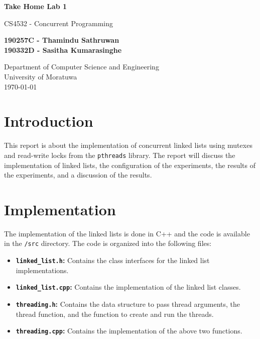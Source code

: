 \documentclass[a4paper,12pt]{article}
\begin{document}
\begin{titlepage}
    \begin{center}
        \vspace*{1cm}

        \LARGE
        \textbf{Take Home Lab 1}

        \vspace{0.5cm}

        \large
        CS4532 - Concurrent Programming

        \vspace{1.5cm}

        \textbf{190257C - Thamindu Sathruwan\\190332D - Sasitha Kumarasinghe}

        \vfill

        \normalsize
        Department of Computer Science and Engineering\\
        University of Moratuwa\\
        \today

    \end{center}
\end{titlepage}

\tableofcontents
\newpage

\section{Introduction}

This report is about the implementation of concurrent linked lists using mutexes and read-write locks from the \lstinline|pthreads| library. The report will discuss the implementation of linked lists, the configuration of the experiments, the results of the experiments, and a discussion of the results.

\section{Implementation}

The implementation of the linked lists is done in C++ and the code is available in the \lstinline|/src| directory. The code is organized into the following files:

\begin{itemize}
    \itemsep 0em
    \item \textbf{\lstinline|linked_list.h|:} Contains the class interfaces for the linked list implementations.
    \item \textbf{\lstinline|linked_list.cpp|:} Contains the implementation of the linked list classes.
    \item \textbf{\lstinline|threading.h|:} Contains the data structure to pass thread arguments, the thread function, and the function to create and run the threads.
    \item \textbf{\lstinline|threading.cpp|:} Contains the implementation of the above two functions.
\end{itemize}
\end{document}
